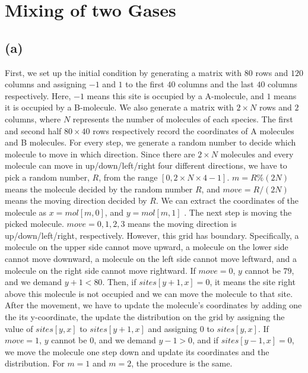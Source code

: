 \documentclass{article}
\begin{document}
\section{Mixing of two Gases}
\subsection{(a)}
First, we set up the initial condition by generating a matrix with $80$ rows
and $120$ columns and assigning $-1$ and $1$ to the first $40$ columns and
the last $40$ columns respectively. Here, $-1$ means this site is occupied
by a A-molecule, and $1$ means it is occupied by a B-molecule. We also
generate a matrix with $2\times N$ rows and $2$ columns, where $N$
represents the number of molecules of each species. The first and second
half $80\times 40$ rows respectively record the coordinates of A molecules
and B molecules. For every step, we generate a random number to decide which
molecule to move in which direction. Since there are $2\times N$ molecules
and every molecule can move in up/down/left/right four different directions,
we have to pick a random number, $R$, from the range $\left[ 0,2\times
N\times 4-1\right] $. $m=R\%(2N)$ means the molecule decided by the random
number $R$, and $move=R/(2N)$ means the moving direction decided by $R$. We
can extract the coordinates of the molecule as $x=mol[m,0]$, and $y=mol[m,1]$%
. The next step is moving the picked molecule. $move=0,1,2,3$ means the
moving direction is up/down/left/right, respectively. However, this grid has
boundary. Specifically, a molecule on the upper side cannot move upward, a
molecule on the lower side cannot move downward, a molecule on the left side
cannot move leftward, and a molecule on the right side cannot move
rightward. If $move=0$, $y$ cannot be $79$, and we demand $y+1<80$. Then, if 
$sites[y+1,x]=0$, it means the site right above this molecule is not
occupied and we can move the molecule to that site. After the movement, we
have to update the molecule's coordinates by adding one the its
y-coordinate, the update the distribution on the grid by assigning the value
of $sites[y,x]$ to $sites[y+1,x]$ and assigning $0$ to $sites[y,x]$. If $%
move=1$, $y$ cannot be $0$, and we demand $y-1>0$, and if $sites[y-1,x]=0$,
we move the molecule one step down and update its coordinates and the
distribution. For $m=1$ and $m=2$, the procedure is the same.
\end{document}
